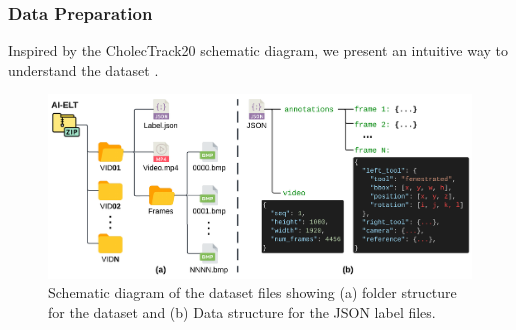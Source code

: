 

\subsubsection{Data Preparation}

Inspired by the CholecTrack20 schematic diagram, we present an intuitive way to understand the dataset \cite{nwoye_cholectrack20_2023}.

\begin{figure}[htbp]
    \centering
    \vspace*{-2mm}
    \includegraphics[width=\linewidth]{schematic_diagram.png}
    \vspace*{-7.5mm}
    \caption{Schematic diagram of the dataset files showing (a) folder structure for the dataset and (b) Data structure for the JSON label files.}
    \vspace*{-2.5mm}
    \label{fig:schematic_diagram}
\end{figure}

